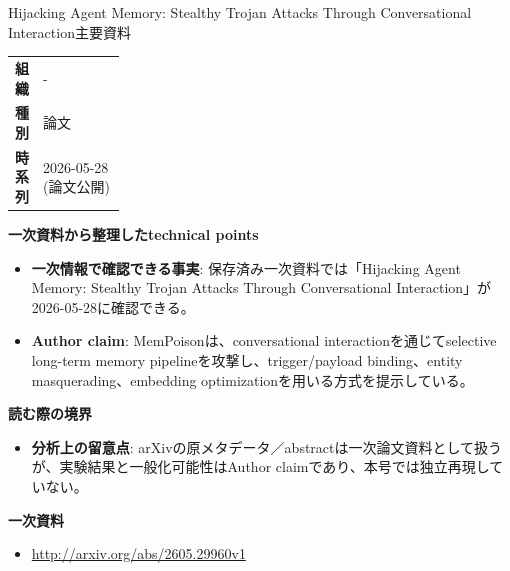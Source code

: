 \begin{technicalnote}{Hijacking Agent Memory: Stealthy Trojan Attacks Through Conversational Interaction}{主要資料}
\begingroup
\begin{tabularx}{\linewidth}{@{}>{\bfseries}p{0.22\linewidth}X@{}}
組織 & - \\
種別 & 論文 \\
時系列 & 2026-05-28 (論文公開) \\
\end{tabularx}
\smallskip
{\bfseries 一次資料から整理したtechnical points}
\begin{itemize}[leftmargin=1.5em,itemsep=0.35em]
\item \textbf{一次情報で確認できる事実}: 保存済み一次資料では「Hijacking Agent Memory: Stealthy Trojan Attacks Through Conversational Interaction」が2026-05-28に確認できる。
\end{itemize}
\begin{minipage}{\linewidth}
\begin{itemize}[leftmargin=1.5em,itemsep=0.35em]
\item \textbf{Author claim}: MemPoisonは、conversational interactionを通じてselective long-term memory pipelineを攻撃し、trigger/payload binding、entity masquerading、embedding optimizationを用いる方式を提示している。
\end{itemize}
{\bfseries 読む際の境界}
\begin{itemize}[leftmargin=1.5em,itemsep=0.35em]
\item \textbf{分析上の留意点}: arXivの原メタデータ／abstractは一次論文資料として扱うが、実験結果と一般化可能性はAuthor claimであり、本号では独立再現していない。
\end{itemize}
\begin{samepage}
{\bfseries 一次資料}
\begingroup\sloppy
\begin{itemize}[leftmargin=1.5em,itemsep=0.25em]
\item {\scriptsize\url{http://arxiv.org/abs/2605.29960v1}}
\end{itemize}
\endgroup
\end{samepage}
\end{minipage}
\endgroup
\end{technicalnote}
\medskip

